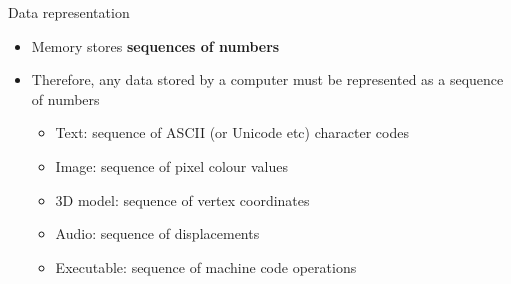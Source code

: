 \begin{frame}{Data representation} 
	\begin{itemize}
		\pause\item Memory stores \textbf{sequences of numbers}
		\pause\item Therefore, any data stored by a computer must be represented as a sequence of numbers
			\begin{itemize}
				\pause\item Text: sequence of ASCII (or Unicode etc) character codes
				\pause\item Image: sequence of pixel colour values
				\pause\item 3D model: sequence of vertex coordinates
				\pause\item Audio: sequence of displacements
				\pause\item Executable: sequence of machine code operations
			\end{itemize}
	\end{itemize}
\end{frame}
